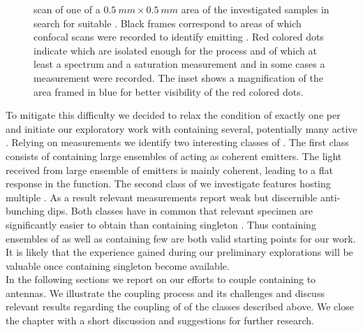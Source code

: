 		\begin{figure}[htbp]
			\centering
			\caption[LSM scan, overview of a $\SI{0.5}{mm}\times\SI{0.5}{mm}$ area]{\Lsm scan of one of a $\SI{0.5}{mm}\times\SI{0.5}{mm}$ area of the investigated samples in search for suitable \nds. Black frames correspond to areas of which confocal scans were recorded to identify \nds emitting \fl. Red colored dots indicate \nds which are isolated enough for the \pp process and of which at least a \pl spectrum and a saturation measurement and in some cases a \gt measurement were recorded. The inset shows a magnification of the area framed in blue for better visibility of the red colored dots.}
			\label{fig::milky_way2}
		\end{figure}
		
		To mitigate this difficulty we decided to relax the condition of exactly one \siv per \nd and initiate our exploratory work with \nds containing several, potentially many active \sivs. 
		Relying on \gt measurements we identify two interesting classes of \nds. 
		The first class consists of \nds containing large ensembles of \sivs acting as coherent emitters. 
		The \fl light received from large ensemble of emitters is mainly coherent, leading to a flat response in the \gtz function. 
		The second class of \nds we investigate features \nds hosting multiple \sivs. 
		As a result relevant \gtz measurements report weak but discernible anti-bunching dips. 
		Both classes have in common that relevant \nd specimen are significantly easier to obtain than \nds containing singleton \sivs. 
		Thus \nds containing ensembles of \sivs as well as \nds containing few \sivs are both valid starting points for our work. 
		It is likely that the experience gained during our preliminary explorations will be valuable once \nds containing singleton \sivs become available.
		\\
		In the following sections we report on our efforts to couple \nds containing \sivs to antennas. We illustrate the coupling process and its challenges and discuss relevant results regarding the coupling of \nds of the classes described above. We close the chapter with a short discussion and suggestions for further research.

